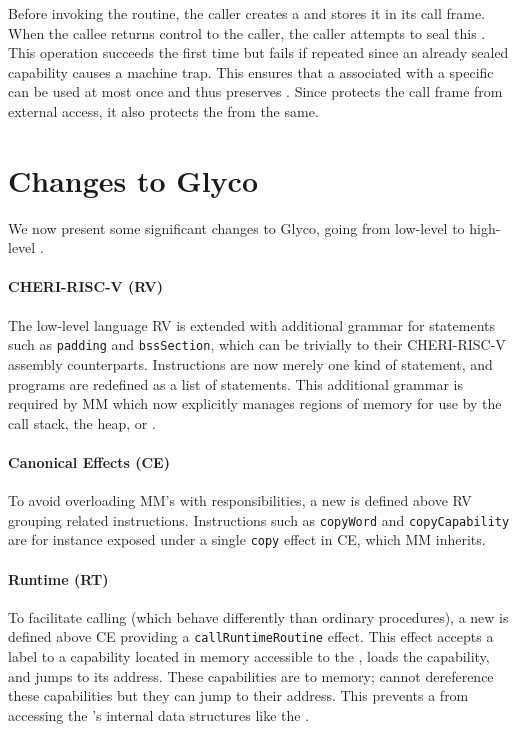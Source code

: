 \documentclass[main.tex]{subfiles}
\begin{document}
Before invoking the  routine, the caller creates a  and stores it in its call frame. When the callee returns control to the caller, the caller attempts to seal this . This operation succeeds the first time but fails if repeated since  an already sealed capability causes a machine trap. This ensures that a  associated with a specific  can be used at most once and thus preserves . Since  protects the call frame from external access, it also protects the  from the same.

\section{Changes to Glyco} \label{sct:ghscc-changes}
We now present some significant changes to Glyco, going from low-level to high-level .

\paragraph{CHERI-RISC-V (RV)} The low-level language RV is extended with additional grammar for statements such as \texttt{padding} and \texttt{bssSection}, which can be  trivially to their CHERI-RISC-V assembly counterparts. Instructions are now merely one kind of statement, and programs are redefined as a list of statements. This additional grammar is required by MM which now explicitly manages regions of memory for use by the call stack, the heap, or .

\paragraph{Canonical Effects (CE)} To avoid overloading MM's  with responsibilities, a new  is defined above RV grouping related instructions. Instructions such as \texttt{copyWord} and \texttt{copyCapability} are for instance exposed under a single \texttt{copy} effect in CE, which MM inherits.

\paragraph{Runtime (RT)} To facilitate calling  (which behave differently than ordinary procedures), a new  is defined above CE providing a \texttt{callRuntimeRoutine} effect. This effect accepts a label to a capability located in memory accessible to the , loads the capability, and jumps to its address. These capabilities are  to  memory;  cannot dereference these capabilities but they can jump to their address. This prevents a  from accessing the 's internal data structures like the .
\end{document}
